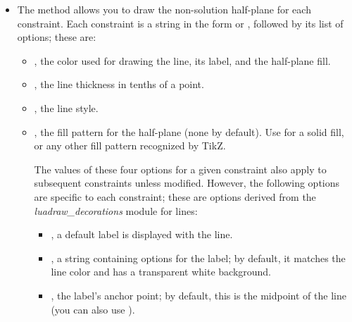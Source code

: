 \begin{itemize}
\begin{itemize}
\begin{itemize}
            \item {}, label writing direction; by default, this follows the direction of the line.

            \item {}, position of the label relative to its anchor point; by default, the label is placed on the opposite side of the solution polygon. 
        \end{itemize}
    \end{itemize}

    \item The method  allows you to draw the non-solution half-plane for each constraint. Each constraint is a string in the form  or , followed by its list of options; these are:
    \begin{itemize}
        \item {}, the color used for drawing the line, its label, and the half-plane fill. 

        \item {}, the line thickness in tenths of a point. 

        \item {}, the line style. 

        \item {}, the fill pattern for the half-plane (none by default). Use  for a solid fill, or any other fill pattern recognized by TikZ. 

        The values ​​of these four options for a given constraint also apply to subsequent constraints unless modified. However, the following options are specific to each constraint; these are options derived from the \emph{luadraw\_decorations} module for lines:
        \begin{itemize}
            \item {}, a default label is displayed with the line. 
    
            \item {}, a string containing options for the label; by default, it matches the line color and has a transparent white background. 
    
            \item {}, the label's anchor point; by default, this is the midpoint of the line (you can also use ). 
    

\end{itemize}
\end{itemize}
\end{itemize}

